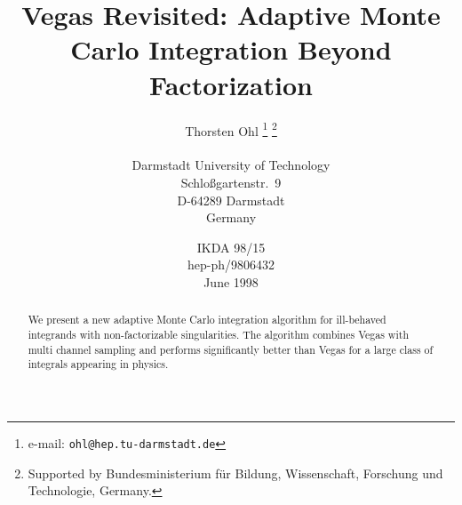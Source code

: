 \documentclass[12pt,a4paper]{article}
\begin{document}
\title{%
  Vegas Revisited:
  Adaptive Monte Carlo Integration Beyond Factorization}
\author{%
  Thorsten Ohl%
    \thanks{e-mail: \texttt{ohl@hep.tu-darmstadt.de}}
  {}\thanks{Supported by Bundesministerium f\"ur Bildung,
       Wissenschaft, Forschung und Technologie, Germany.}\\
  \hfil \\
  Darmstadt University of Technology  \\
  Schlo\ss gartenstr.~9 \\
  D-64289 Darmstadt \\
  Germany}
\date{%
  IKDA 98/15\\
  hep-ph/9806432\\
  June 1998}
\maketitle
\begin{abstract}
  We present a new adaptive Monte Carlo integration algorithm for
  ill-behaved integrands with non-factorizable singularities.  The
  algorithm combines Vegas with multi channel sampling and performs
  significantly better than Vegas for a large class of integrals
  appearing in physics.
\end{abstract}
\end{document}
